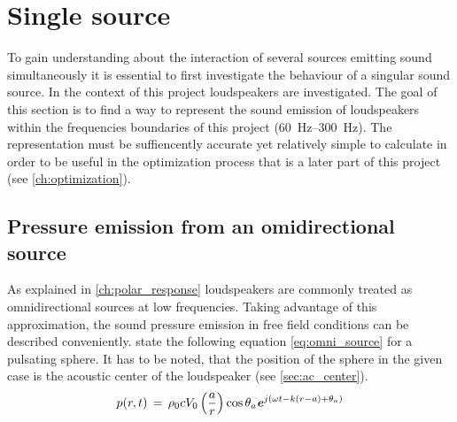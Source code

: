 \section{Single source}\label{ch:single_speaker_source}
To gain understanding about the interaction of several sources emitting sound simultaneously it is essential to first investigate the behaviour of a singular sound source. In the context of this project loudspeakers are investigated. The goal of this section is to find a way to represent the sound emission of loudspeakers within the frequencies boundaries of this project (\SIrange{60}{300}{\hertz}).
The representation must be suffiencently accurate yet relatively simple to calculate in order to be useful in the optimization process that is a later part of this project (see \autoref{ch:optimization}).

\subsection{Pressure emission from an omidirectional source}\label{ssec:omni}
As explained in \autoref{ch:polar_response} loudspeakers are commonly treated as omnidirectional sources at low frequencies. Taking advantage of this approximation, the sound pressure emission in free field conditions can be described conveniently. \citep[p. 171]{Kinsler2000} state the following equation \autoref{eq:omni_source} for a pulsating sphere. It has to be noted, that the position of the sphere in the given case is the acoustic center of the loudspeaker (see \autoref{sec:ac_center}).
\begin{equation}\label{eq:omni_source}
p(r,t)\,=\,\rho_0 c V_0 \left(\frac{a}{r}\right)\cos \theta_a \textbf{\textit{e}}^{j\left(\omega t - k(r-a)+\theta_a\right)}
\end{equation}
\startexplain
{}
\stopexplain

